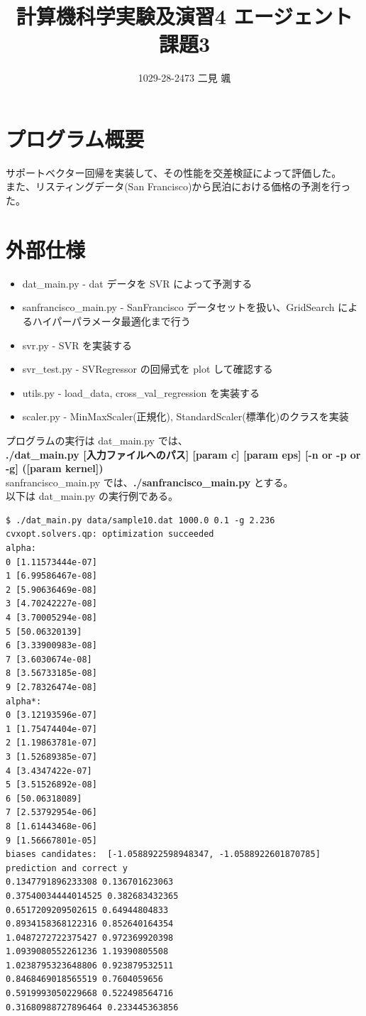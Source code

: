 \documentclass{jsarticle}
\begin{document}
\title{計算機科学実験及演習4 エージェント 課題3}
\author{1029-28-2473 二見 颯}
\maketitle

\section{プログラム概要}
サポートベクター回帰を実装して、その性能を交差検証によって評価した。 \\
また、リスティングデータ(San Francisco)から民泊における価格の予測を行った。

\section{外部仕様}
\begin{itemize}
    \item dat\_main.py - dat データを SVR によって予測する
    \item sanfrancisco\_main.py - SanFrancisco データセットを扱い、GridSearch によるハイパーパラメータ最適化まで行う
    \item svr.py - SVR を実装する
    \item svr\_test.py - SVRegressor の回帰式を plot して確認する
    \item utils.py - load\_data, cross\_val\_regression を実装する 
    \item scaler.py - MinMaxScaler(正規化), StandardScaler(標準化)のクラスを実装
\end{itemize}
プログラムの実行は dat\_main.py では、\\
{\bf ./dat\_main.py [入力ファイルへのパス] [param c] [param eps] [-n or -p or -g] ([param kernel])} \\ 
sanfrancisco\_main.py では、{\bf ./sanfrancisco\_main.py} とする。 \\
以下は dat\_main.py の実行例である。
\begin{lstlisting}
$ ./dat_main.py data/sample10.dat 1000.0 0.1 -g 2.236
cvxopt.solvers.qp: optimization succeeded
alpha: 
0 [1.11573444e-07]
1 [6.99586467e-08]
2 [5.90636469e-08]
3 [4.70242227e-08]
4 [3.70005294e-08]
5 [50.06320139]
6 [3.33900983e-08]
7 [3.6030674e-08]
8 [3.56733185e-08]
9 [2.78326474e-08]
alpha*: 
0 [3.12193596e-07]
1 [1.75474404e-07]
2 [1.19863781e-07]
3 [1.52689385e-07]
4 [3.4347422e-07]
5 [3.51526892e-08]
6 [50.06318089]
7 [2.53792954e-06]
8 [1.61443468e-06]
9 [1.56667801e-05]
biases candidates:  [-1.0588922598948347, -1.0588922601870785]
prediction and correct y
0.1347791896233308 0.136701623063
0.37540034444014525 0.382683432365
0.6517209209502615 0.64944804833
0.8934158368122316 0.852640164354
1.0487272722375427 0.972369920398
1.0939080552261236 1.19390805508
1.0238795323648806 0.923879532511
0.8468469018565519 0.7604059656
0.5919993050229668 0.522498564716
0.31680988727896464 0.233445363856
\end{lstlisting}
\end{document}
